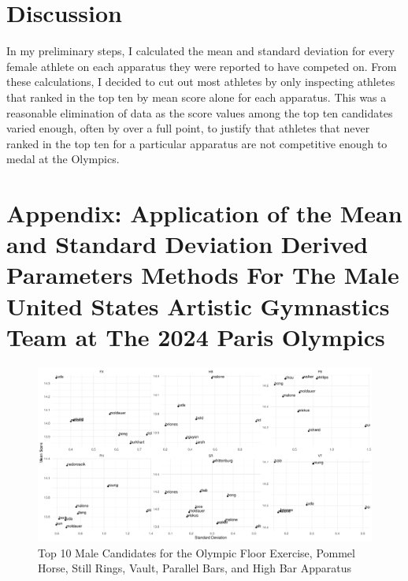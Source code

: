 \documentclass[12pt]{article}
\begin{document}
\section{Discussion}
\label{sec:dis}

In my preliminary steps, I calculated the mean and standard deviation for every female athlete on each 
apparatus they were reported to have competed on. From these calculations, I decided to cut out most athletes 
by only inspecting athletes that ranked in the top ten by mean score alone for each apparatus. This was a 
reasonable elimination of data as the score values among the top ten candidates varied enough, often by over a 
full point, to justify that athletes that never ranked in the top ten for a particular apparatus are not 
competitive enough to medal at the Olympics.



\appendix

\section{Appendix: Application of the Mean and Standard Deviation Derived Parameters Methods For The Male 
United States Artistic Gymnastics Team at The 2024 Paris Olympics}

\begin{figure}
  \centering
  \includegraphics[scale=0.5]{MaleAthleteApparatus.pdf}
  \caption{Top 10 Male Candidates for the Olympic Floor Exercise, Pommel Horse, Still Rings, Vault, Parallel Bars, 
  and High Bar Apparatus}
  \label{fig:FA}
\end{figure}
\end{document}
